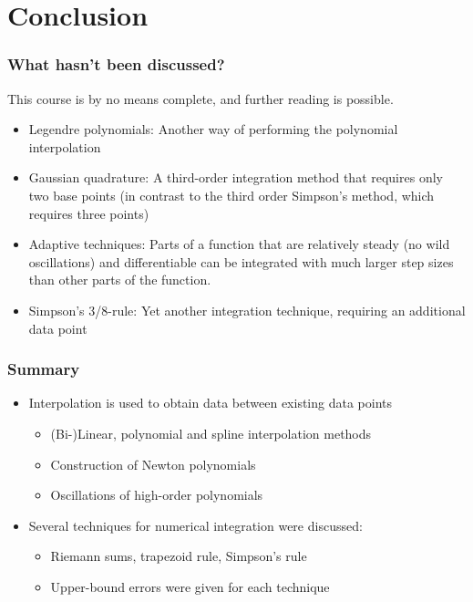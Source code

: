 \documentclass[11pt,table,final,fleqn,xcolor={usenames,dvipsnames,table},handout]{beamer}
\begin{document}
\section{Conclusion}
\begin{frame}
  \frametitle{What hasn't been discussed?}
  This course is by no means complete, and further reading is possible.
   \begin{itemize}
      \item Legendre polynomials: Another way of performing the polynomial interpolation
      \item Gaussian quadrature: A third-order integration method that requires only two base points (in contrast to the third order Simpson's method, which requires three points)
      \item Adaptive techniques: Parts of a function that are relatively steady (no wild oscillations) and differentiable can be integrated with much larger step sizes than other parts of the function.
      \item Simpson's 3/8-rule: Yet another integration technique, requiring an additional data point
   \end{itemize}
\end{frame}

\begin{frame}
  \frametitle{Summary}
  \begin{itemize}
    \item Interpolation is used to obtain data between existing data points
    \begin{itemize}
      \item (Bi-)Linear, polynomial and spline interpolation methods
      \item Construction of Newton polynomials
      \item Oscillations of high-order polynomials
    \end{itemize}
    \item Several techniques for numerical integration were discussed:
    \begin{itemize}
      \item Riemann sums, trapezoid rule, Simpson's rule
      \item Upper-bound errors were given for each technique
    \end{itemize}
  \end{itemize}
\end{frame}
\end{document}
